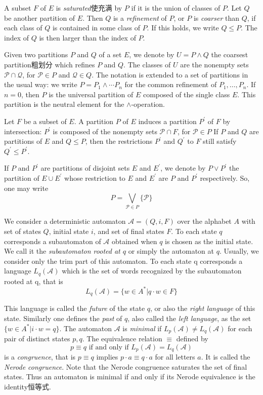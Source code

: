 A subset $F$ of $E$ is \textit{saturated}使充满 by $P$ if it is the union of classes of $P$. Let $Q$ be another partition of $E$. Then $Q$ is a \textit{refinement} of $P$, or $P$ is \textit{coarser} than $Q$, if each class of $Q$ is contained in some class of $P$. If this holds, we write $Q \le P$. The index of $Q$ is then larger than the index of $P$.

Given two partitions $P$ and $Q$ of a set $E$, we denote by $U = P\land Q $ the coarsest partition粗划分 which refines $P$ and $Q$. The classes of $U$ are the nonempty sets $\mathcal{P}\cap \mathcal{Q}$, for $\mathcal{P} \in P $ and $\mathcal{Q} \in Q.$ The notation is extended to a set of partitions in the usual way: we write $P = P_1\land\cdots P_n$ for the common refinement of $P_1,\dots,P_n$. If $n = 0$, then $P$ is
the universal partition of $E$ composed of the single class $E$. This partition is the neutral element for the $\land$-operation.

Let $F$ be a subset of $E$. A partition $P$ of $E$ induces a partition $P^\prime$ of $F$ by intersection: $P^\prime$ is composed of the nonempty sets $\mathcal{P}\cap F$, for $\mathcal{P}\in P$ If $P$ and $Q$ are partitions of $E$
and $Q\le P$, then the restrictions $P^\prime$ and $Q^\prime$ to $F$ still satisfy $Q^\prime \le P^\prime$.

If $P$ and $P^\prime$ are partitions of disjoint sets $E$ and $E^\prime$, we denote by $P\lor P^\prime$ the partition
of $E\cup E^\prime$ whose restriction to $E$ and $E^\prime$ are $P$ and $P^\prime$ respectively. So, one may write
\[ P =\bigvee_{\mathcal{P}\in P}\{\mathcal{P}\} \]

\begin{definition}
	We consider a deterministic automaton $\mathcal{A} = (Q, i, F)$ over the alphabet $A$ with set of states $Q$, initial state $i$, and set of final states $F$. To each state $q$ corresponds a subautomaton of $\mathcal{A}$ obtained when $q$ is chosen as the initial state. We call it the \textit{subautomaton rooted at $q$} or simply the automaton at $q$. Usually, we consider only	the trim part of this automaton. To each state q corresponds a language $L_q(\mathcal{A})$ which is the set of words recognized by the subautomaton rooted at q, that is
	\[L_q(\mathcal{A})=\{w\in A^\ast |q\cdot w\in F\} \]
	
	This language is called the \textit{future} of the state $q$, or also the \textit{right language} of this state. Similarly one defines the \textit{past} of $q$, also called the \textit{left language}, as the set $\{w\in A^\ast|i\cdot w = q \}$. The automaton $\mathcal{A}$ is \textit{minimal} if $L_p(\mathcal{A}) \ne L_q(\mathcal{A})$ for each pair of distinct states $p, q$. The equivalence relation $\equiv$ defined by
	\[p\equiv q \text{ if and only if } L_p(\mathcal{A})=L_q(\mathcal{A}) \]
	is a \textit{congruence}, that is $p\equiv q$ implies $p\cdot a\equiv q\cdot a$ for all letters $a$. It is called the \textit{Nerode congruence}. Note that the Nerode congruence saturates the set of final states. Thus an	automaton is minimal if and only if its Nerode equivalence is the identity恒等式.
\end{definition}

